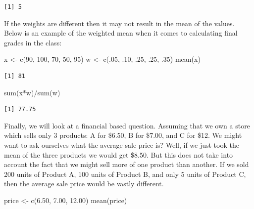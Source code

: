\documentclass[
  letterpaper,
  DIV=11,
  numbers=noendperiod]{scrreprt}
\newenvironment{Shaded}{\begin{snugshade}}{\end{snugshade}}
\newcommand{\DecValTok}[1]{\textcolor[rgb]{0.68,0.00,0.00}{#1}}
\newcommand{\FloatTok}[1]{\textcolor[rgb]{0.68,0.00,0.00}{#1}}
\newcommand{\FunctionTok}[1]{\textcolor[rgb]{0.28,0.35,0.67}{#1}}
\newcommand{\NormalTok}[1]{\textcolor[rgb]{0.00,0.23,0.31}{#1}}
\newcommand{\OtherTok}[1]{\textcolor[rgb]{0.00,0.23,0.31}{#1}}
\newcommand{\SpecialCharTok}[1]{\textcolor[rgb]{0.37,0.37,0.37}{#1}}
\begin{document}
\begin{verbatim}
[1] 5
\end{verbatim}

If the weights are different then it may not result in the mean of the
values. Below is an example of the weighted mean when it comes to
calculating final grades in the class:

\begin{Shaded}
\begin{Highlighting}[]
\NormalTok{x }\OtherTok{\textless{}{-}} \FunctionTok{c}\NormalTok{(}\DecValTok{90}\NormalTok{, }\DecValTok{100}\NormalTok{, }\DecValTok{70}\NormalTok{, }\DecValTok{50}\NormalTok{, }\DecValTok{95}\NormalTok{)}
\NormalTok{w }\OtherTok{\textless{}{-}} \FunctionTok{c}\NormalTok{(.}\DecValTok{05}\NormalTok{, .}\DecValTok{10}\NormalTok{, .}\DecValTok{25}\NormalTok{, .}\DecValTok{25}\NormalTok{, .}\DecValTok{35}\NormalTok{)}
\FunctionTok{mean}\NormalTok{(x)}
\end{Highlighting}
\end{Shaded}

\begin{verbatim}
[1] 81
\end{verbatim}

\begin{Shaded}
\begin{Highlighting}[]
\FunctionTok{sum}\NormalTok{(x}\SpecialCharTok{*}\NormalTok{w)}\SpecialCharTok{/}\FunctionTok{sum}\NormalTok{(w)}
\end{Highlighting}
\end{Shaded}

\begin{verbatim}
[1] 77.75
\end{verbatim}

Finally, we will look at a financial based question. Assuming that we
own a store which sells only 3 products: A for \$6.50, B for \$7.00, and
C for \$12. We might want to ask ourselves what the average sale price
is? Well, if we just took the mean of the three products we would get
\$8.50. But this does not take into account the fact that we might sell
more of one product than another. If we sold 200 units of Product A, 100
units of Product B, and only 5 units of Product C, then the average sale
price would be vastly different.

\begin{Shaded}
\begin{Highlighting}[]
\NormalTok{price }\OtherTok{\textless{}{-}} \FunctionTok{c}\NormalTok{(}\FloatTok{6.50}\NormalTok{, }\FloatTok{7.00}\NormalTok{, }\FloatTok{12.00}\NormalTok{)}
\FunctionTok{mean}\NormalTok{(price)}
\end{Highlighting}
\end{Shaded}
\end{document}
